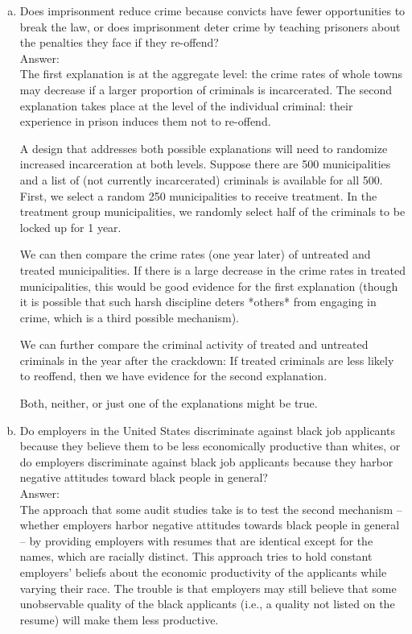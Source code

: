 \documentclass[11pt,notitlepage]{article}\usepackage[]{graphicx}\usepackage[]{color}
\begin{document}
\begin{enumerate}[a)]

\item Does imprisonment reduce crime because convicts have fewer opportunities to break the law, or does imprisonment deter crime by teaching prisoners about the penalties they face if they re-offend?\\
Answer:\\

The first explanation is at the aggregate level: the crime rates of whole towns may decrease if a larger proportion of criminals is incarcerated. The second explanation takes place at the level of the individual criminal: their experience in prison induces them not to re-offend.

A design that addresses both possible explanations will need to randomize increased incarceration at both levels. Suppose there are 500 municipalities and a list of (not currently incarcerated) criminals is available for all 500. First, we select a random 250 municipalities to receive treatment. In the treatment group municipalities, we randomly select half of the criminals to be locked up for 1 year.

We can then compare the crime rates (one year later) of untreated and treated municipalities. If there is a large decrease in the crime rates in treated municipalities, this would be good evidence for the first explanation (though it is possible that such harsh discipline deters *others* from engaging in crime, which is a third possible mechanism).  

We can further compare the criminal activity of treated and untreated criminals in the year after the crackdown: If treated criminals are less likely to reoffend, then we have evidence for the second explanation. 

Both, neither, or just one of the explanations might be true.

\item Do employers in the United States discriminate against black job applicants because they believe them to be less economically productive than whites, or do employers discriminate against black job applicants because they harbor negative attitudes toward black people in general?\\
Answer:\\

The approach that some audit studies take is to test the second mechanism -- whether employers harbor negative attitudes towards black people in general -- by providing employers with resumes that are identical except for the names, which are racially distinct. This approach tries to hold constant employers' beliefs about the economic productivity of the applicants while varying their race. The trouble is that employers may still believe that some unobservable quality of the black applicants (i.e., a quality not listed on the resume) will make them less productive.  


\end{enumerate}
\end{document}
